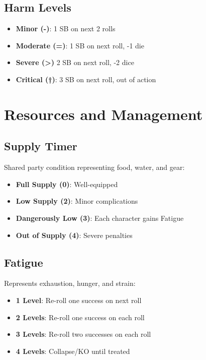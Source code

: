 \documentclass[11pt,twoside]{article}
\begin{document}
\subsection{Harm Levels}
\begin{itemize}[leftmargin=*]
    \item \textbf{Minor (-)}: 1 SB on next 2 rolls
    \item \textbf{Moderate (=)}: 1 SB on next roll, -1 die
    \item \textbf{Severe (>) } 2 SB on next roll, -2 dice
    \item \textbf{Critical (†)}: 3 SB on next roll, out of action
\end{itemize}

\section{Resources and Management}

\subsection{Supply Timer }
Shared party condition representing food, water, and gear:
\begin{itemize}[leftmargin=*]
    \item \textbf{Full Supply (0)}: Well-equipped
    \item \textbf{Low Supply (2)}: Minor complications
    \item \textbf{Dangerously Low (3)}: Each character gains Fatigue
    \item \textbf{Out of Supply (4)}: Severe penalties
\end{itemize}

\subsection{Fatigue}
Represents exhaustion, hunger, and strain:
\begin{itemize}[leftmargin=*]
    \item \textbf{1 Level}: Re-roll one success on next roll
    \item \textbf{2 Levels}: Re-roll one success on each roll
    \item \textbf{3 Levels}: Re-roll two successes on each roll
    \item \textbf{4 Levels}: Collapse/KO until treated
\end{itemize}
\end{document}
